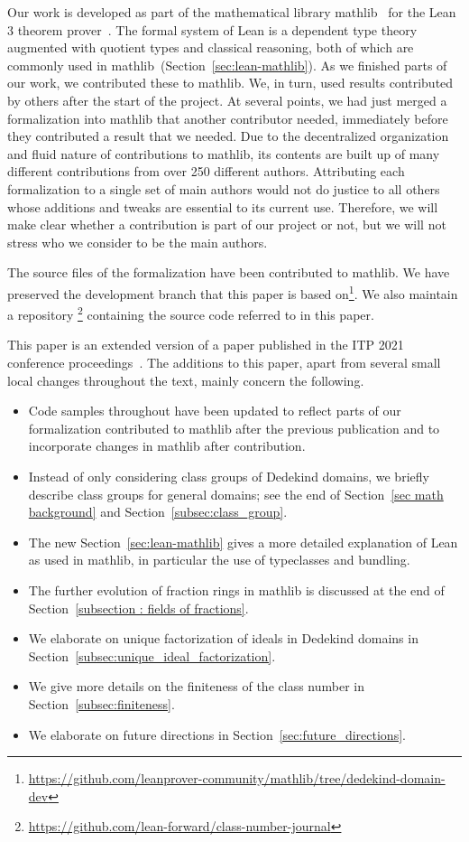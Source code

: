 \documentclass[sn-mathphys]{sn-jnl}%
\newcommand{\mathlib}{\textsf{mathlib}\xspace}
\begin{document}
Our work is developed as part of the mathematical library \mathlib~\cite{mathlib} for the Lean 3 theorem prover~\cite{lean-prover}.
The formal system of Lean is a dependent type theory augmented with quotient types and classical reasoning, both of which are commonly used in \mathlib~(Section~\ref{sec:lean-mathlib}).
As we finished parts of our work, we contributed these to \mathlib.
We, in turn, used results contributed by others after the start of the project.
At several points, we had just merged a formalization into \mathlib that another contributor needed,
immediately before they contributed a result that we needed.
Due to the decentralized organization and fluid nature of contributions to \mathlib, its contents are built up of many different contributions from over 250 different authors.
Attributing each formalization to a single set of main authors would not do justice to all others whose additions and tweaks are essential to its current use.
Therefore, we will make clear whether a contribution is part of our project or not, but we will not stress who we consider to be the main authors.

The source files of the formalization have been contributed to \mathlib.
We have preserved the development branch that this paper is based on\footnote{\url{https://github.com/leanprover-community/mathlib/tree/dedekind-domain-dev}}.
We also maintain a
repository%
\footnote{\url{https://github.com/lean-forward/class-number-journal}}
containing the source code referred to in this paper.

This paper is an extended version of a paper published in the ITP 2021 conference proceedings~\cite{ClassGroupsITP2021}. The additions to this paper, apart from several small local changes throughout the text, mainly concern the following.
\begin{itemize}
 \item Code samples throughout have been updated to reflect parts of our formalization contributed to \mathlib after the previous publication and to incorporate changes in \mathlib after contribution.
 \item Instead of only considering class groups of Dedekind domains, we briefly describe class groups for general domains; see the end of Section~\ref{sec math background} and Section~\ref{subsec:class_group}.
 \item The new Section~\ref{sec:lean-mathlib} gives a more detailed explanation of Lean as used in \mathlib, in particular the use of typeclasses and bundling.
 \item The further evolution of fraction rings in \mathlib is discussed at the end of Section~\ref{subsection : fields of fractions}.
 \item We elaborate on unique factorization of ideals in Dedekind domains in Section~\ref{subsec:unique_ideal_factorization}.
 \item We give more details on the finiteness of the class number in Section~\ref{subsec:finiteness}.
 \item We elaborate on future directions in Section~\ref{sec:future_directions}.
\end{itemize}
\end{document}
